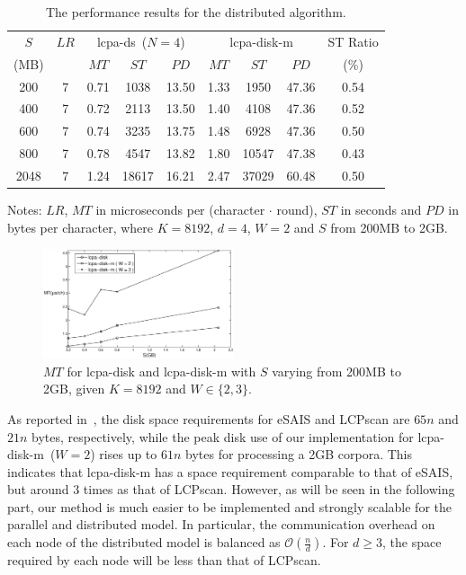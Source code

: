 \documentclass[10pt,journal,letterpaper,compsoc]{IEEEtran}
\begin{document}
\begin{CJK*}{GBK}{song}
\begin{table}[htbp!]
\begin{threeparttable}
\caption{The performance results for the distributed algorithm.}
\label{tbl:diskm_vs_ds}
\centering
\begin{tabular}{|c|c|c|c|c|c|c|c|c|}
\hline
$S$ & $LR$ & \multicolumn{3}{c|}{lcpa-ds~($N=4$)} & \multicolumn{3}{c|}{lcpa-disk-m} & ST Ratio\\
\cline{3-8}
(MB) & & $MT$ & $ST$ & $PD$ & $MT$ & $ST$ & $PD$ & (\%)\\
\hline
200 & 7 & 0.71 & 1038 & 13.50 & 1.33 & 1950 & 47.36 & 0.54 \\
\hline
400 & 7 & 0.72 & 2113 & 13.50 & 1.40 & 4108 & 47.36 & 0.52 \\
\hline
600 & 7 & 0.74 & 3235 & 13.75 & 1.48 & 6928 & 47.36 & 0.50 \\
\hline
800 & 7 & 0.78 & 4547 & 13.82 & 1.80 & 10547 & 47.38 & 0.43 \\
\hline
2048 & 7 & 1.24 & 18617 & 16.21 & 2.47 & 37029 & 60.48 & 0.50 \\
\hline
\end{tabular}
\begin{tablenotes}
\item Notes: $LR$, $MT$ in microseconds per (character $\cdot$ round), $ST$ in seconds and $PD$ in bytes per character, where $K=8192$, $d=4$, $W=2$ and $S$ from 200MB to 2GB.
\end{tablenotes}
\end{threeparttable}
\centering
\end{table}

\begin{figure}[hbtp!]
  \centering
  \includegraphics[width=0.5\textwidth]{disk_vs_diskm.eps}
  \caption{$MT$ for lcpa-disk and lcpa-disk-m with $S$ varying from 200MB to 2GB, given $K=8192$ and $W\in \{2,3\}$.}
  \label{fig:disk_vs_diskm}
\end{figure}

As reported in~\cite{Juha2014}, the disk space requirements for eSAIS and LCPscan are $65n$ and $21n$ bytes, respectively, while the peak disk use of our implementation for lcpa-disk-m~($W=2$) rises up to $61n$ bytes for processing a 2GB corpora. This indicates that {lcpa-disk-m} has a space requirement comparable to that of eSAIS, but around 3 times as that of  LCPscan. However, as will be seen in the following part, our method is much easier to be implemented and strongly scalable for the parallel and distributed model. In particular, the communication overhead on each node of the distributed model is balanced as $\mathcal{O}(\frac{n}{d})$. For $d\ge 3$, the space required by each node will be less than that of LCPscan.


\end{CJK*}
\end{document}

